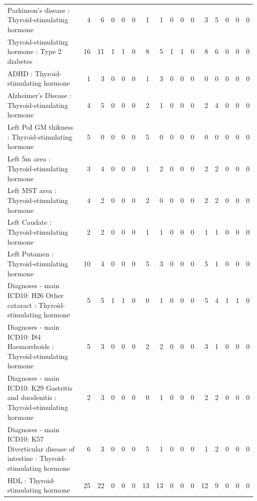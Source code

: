 \begin{table}[ht]
\begin{tabular}{lrrrrrrrrrrrrrrr}
  Parkinson's disease : Thyroid-stimulating hormone  &   4 &   6 &   0 &   0 &   0 &   1 &   1 &   0 &   0 &   0 &   3 &   5 &   0 &   0 &   0 \\ 
  Thyroid-stimulating hormone  : Type 2 diabetes &  16 &  11 &   1 &   1 &   0 &   8 &   5 &   1 &   1 &   0 &   8 &   6 &   0 &   0 &   0 \\ 
  ADHD : Thyroid-stimulating hormone  &   1 &   3 &   0 &   0 &   0 &   1 &   3 &   0 &   0 &   0 &   0 &   0 &   0 &   0 &   0 \\ 
  Alzheimer's Disease : Thyroid-stimulating hormone  &   4 &   5 &   0 &   0 &   0 &   2 &   1 &   0 &   0 &   0 &   2 &   4 &   0 &   0 &   0 \\ 
  Left PoI GM thikness : Thyroid-stimulating hormone  &   5 &   0 &   0 &   0 &   0 &   5 &   0 &   0 &   0 &   0 &   0 &   0 &   0 &   0 &   0 \\ 
  Left 5m area : Thyroid-stimulating hormone  &   3 &   4 &   0 &   0 &   0 &   1 &   2 &   0 &   0 &   0 &   2 &   2 &   0 &   0 &   0 \\ 
  Left MST area : Thyroid-stimulating hormone  &   4 &   2 &   0 &   0 &   0 &   2 &   0 &   0 &   0 &   0 &   2 &   2 &   0 &   0 &   0 \\ 
  Left Caudate : Thyroid-stimulating hormone  &   2 &   2 &   0 &   0 &   0 &   1 &   1 &   0 &   0 &   0 &   1 &   1 &   0 &   0 &   0 \\ 
  Left Putamen : Thyroid-stimulating hormone  &  10 &   4 &   0 &   0 &   0 &   5 &   3 &   0 &   0 &   0 &   5 &   1 &   0 &   0 &   0 \\ 
  Diagnoses - main ICD10: H26 Other cataract : Thyroid-stimulating hormone  &   5 &   5 &   1 &   1 &   0 &   0 &   1 &   0 &   0 &   0 &   5 &   4 &   1 &   1 &   0 \\ 
  Diagnoses - main ICD10: I84 Haemorrhoids : Thyroid-stimulating hormone  &   5 &   3 &   0 &   0 &   0 &   2 &   2 &   0 &   0 &   0 &   3 &   1 &   0 &   0 &   0 \\ 
  Diagnoses - main ICD10: K29 Gastritis and duodenitis : Thyroid-stimulating hormone  &   2 &   3 &   0 &   0 &   0 &   0 &   1 &   0 &   0 &   0 &   2 &   2 &   0 &   0 &   0 \\ 
  Diagnoses - main ICD10: K57 Diverticular disease of intestine : Thyroid-stimulating hormone  &   6 &   3 &   0 &   0 &   0 &   5 &   1 &   0 &   0 &   0 &   1 &   2 &   0 &   0 &   0 \\ 
  HDL : Thyroid-stimulating hormone  &  25 &  22 &   0 &   0 &   0 &  13 &  13 &   0 &   0 &   0 &  12 &   9 &   0 &   0 &   0 \\ 

\end{tabular}
\end{table}

